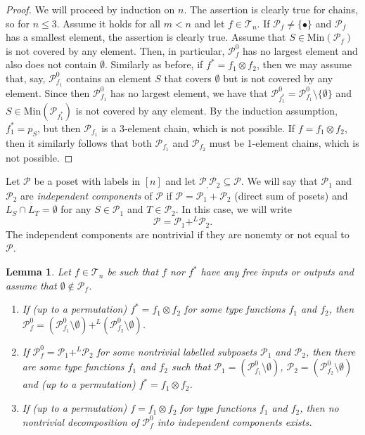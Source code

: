 \documentclass[12pt]{article}
\newtheorem{lemma}{Lemma}
\theoremstyle{definition}
\theoremstyle{remark}
\def\Te{\mathcal T}
\def\Pe{\mathcal P}
\begin{document}
\begin{proof} We will proceed by induction on $n$. The assertion is clearly true for
chains, so for $n\le 3$. Assume it holds for all $m<n$ and let $f\in \Te_n$. 
If $\Pe_f\neq \{\bullet\}$ and $\Pe_f$ has a smallest element, the assertion is
clearly true. Assume that $S\in \mathrm{Min}(\Pe_f)$ is not covered by any element. Then,
in particular, 
$\Pe_f^0$ has no largest element and also does not contain $\emptyset$. Similarly as
before, if $f^*=f_1\otimes f_2$, then we may assume that, say, $\Pe^0_{f_1}$ contains an
element $S$ that covers $\emptyset$ but is not covered by any element. Since then
$\Pe_{f_1}^0$ has no largest element, we have that $\Pe_{f_1^*}^0=\Pe_{f_1}^0\setminus
\{\emptyset\}$ and $S\in \mathrm{Min}(\Pe_{f_1^*})$ is not covered by any element. By the 
induction assumption, $f^*_1=p_{S}$, but then $\Pe_{f_1}$ is a 3-element chain, which is not
possible. If $f=f_1\otimes f_2$, then it similarly follows that both $\Pe_{f_1}$ and
$\Pe_{f_2}$ must be 1-element chains, which is not possible.  

\end{proof}




Let $\Pe$ be a poset with labels in $[n]$ and let $\Pe_,\Pe_2\subseteq \Pe$. We will say that $\Pe_1$ and $\Pe_2$ are {\em independent
components} of $\Pe$ if $\Pe=\Pe_1+\Pe_2$ (direct sum of posets) and $L_S\cap L_T=\emptyset$ for 
any $S\in \Pe_1$ and $T\in \Pe_2$. In this case, we will write
\[
\Pe=\Pe_1+^L\Pe_2.
\]
The independent components are nontrivial if they are nonemty or not equal to $\Pe$.


\begin{lemma}\label{lemma:nofree} Let $f\in \Te_n$ be such that $f$ nor $f^*$ have any
free inputs or outputs and assume that $\emptyset \notin \Pe_{f}$. 
\begin{enumerate}
\item[(i)] If (up to a permutation) $f^*=f_1\otimes f_2$ for some type functions $f_1$ and
$f_2$, then $\Pe_f^0=(\Pe_{f_1}^0\setminus \emptyset) +^L (\Pe_{f_2}^0\setminus
\emptyset)$.
\item[(ii)] If $\Pe_f^0=\Pe_1+^L\Pe_2$ for some nontrivial labelled subposets $\Pe_1$ and $\Pe_2$, 
then there are some type functions $f_1$ and $f_2$ such that $\Pe_1=(\Pe_{f_1}^0\setminus
\emptyset)$, $\Pe_2=(\Pe_{f_2}^0\setminus \emptyset)$ and (up to a permutation)
$f^*=f_1\otimes f_2$.
\item[(iii)] If (up to a permutation) $f=f_1\otimes f_2$ for type functions $f_1$ and
$f_2$, then no nontrivial
decomposition of $\Pe_f^0$ into independent components exists.

\end{enumerate}

\end{lemma}
\end{document}
